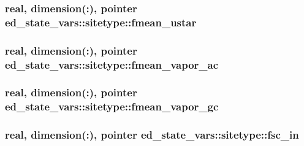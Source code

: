 \subsubsection[{\texorpdfstring{fmean\+\_\+ustar}{fmean_ustar}}]{\setlength{\rightskip}{0pt plus 5cm}real, dimension(\+:), pointer ed\+\_\+state\+\_\+vars\+::sitetype\+::fmean\+\_\+ustar}\hypertarget{structed__state__vars_1_1sitetype_a81efdbbbeb34081406a434e9f6eaa994}{}\label{structed__state__vars_1_1sitetype_a81efdbbbeb34081406a434e9f6eaa994}
\subsubsection[{\texorpdfstring{fmean\+\_\+vapor\+\_\+ac}{fmean_vapor_ac}}]{\setlength{\rightskip}{0pt plus 5cm}real, dimension(\+:), pointer ed\+\_\+state\+\_\+vars\+::sitetype\+::fmean\+\_\+vapor\+\_\+ac}\hypertarget{structed__state__vars_1_1sitetype_a3f0931359295ebe90991caf1d6607ff5}{}\label{structed__state__vars_1_1sitetype_a3f0931359295ebe90991caf1d6607ff5}
\subsubsection[{\texorpdfstring{fmean\+\_\+vapor\+\_\+gc}{fmean_vapor_gc}}]{\setlength{\rightskip}{0pt plus 5cm}real, dimension(\+:), pointer ed\+\_\+state\+\_\+vars\+::sitetype\+::fmean\+\_\+vapor\+\_\+gc}\hypertarget{structed__state__vars_1_1sitetype_afd8b2e49c78ee32bcee76fabc9d4aa69}{}\label{structed__state__vars_1_1sitetype_afd8b2e49c78ee32bcee76fabc9d4aa69}
\subsubsection[{\texorpdfstring{fsc\+\_\+in}{fsc_in}}]{\setlength{\rightskip}{0pt plus 5cm}real, dimension(\+:), pointer ed\+\_\+state\+\_\+vars\+::sitetype\+::fsc\+\_\+in}\hypertarget{structed__state__vars_1_1sitetype_af2d7bf376f7fd1d1e3872c9dafcf8c92}{}\label{structed__state__vars_1_1sitetype_af2d7bf376f7fd1d1e3872c9dafcf8c92}

